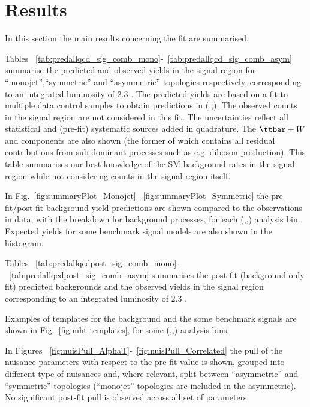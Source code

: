 \section{Results}
\label{sec:results}

In this section the main results concerning the fit are summarised. 

Tables ~\ref{tab:predallqcd_sig_comb_mono}-~\ref{tab:predallqcd_sig_comb_asym} summarise 
the predicted and observed yields in the signal region 
for ``monojet'',``symmetric'' and ``asymmetric'' topologies respectively, 
corresponding to an integrated luminosity of 2.3 \ifb.
The predicted yields are based on a fit to multiple data control samples to obtain predictions in (\nj,\nb,\scalht). 
The observed counts in the signal region are not considered in this fit. 
The uncertainties reflect all statistical and (pre-fit) systematic sources added in quadrature. 
The $\ttbar+W$ and \znunu components are also shown (the former of which contains all residual contributions from sub-dominant processes such as e.g. diboson production). 
This table summarises our best knowledge of the SM background rates in the signal region while not considering counts in the signal region itself. 

In Fig.~\ref{fig:summaryPlot_Monojet}-~\ref{fig:summaryPlot_Symmetric} the pre-fit/post-fit background yield predictions 
are shown compared to the observations in data, with the breakdown for background processes, for each (\njet,\nb,\scalht) analysis bin. 
Expected yields for some benchmark signal models are also shown in the histogram. 

Tables ~\ref{tab:predallqcdpost_sig_comb_mono}-~\ref{tab:predallqcdpost_sig_comb_asym} summarises the post-fit (background-only fit) predicted backgrounds and the 
observed yields in the signal region corresponding to an integrated luminosity of 2.3 \ifb. 

Examples of \mht templates for the background and the some benchmark signals are shown in Fig.~\ref{fig:mht-templates}, 
for some (\njet,\nb,\scalht) analysis bins. 

In Figures ~\ref{fig:nuisPull_AlphaT}-~\ref{fig:nuisPull_Correlated} the pull 
of the nuisance parameters with respect to the pre-fit value is shown, 
grouped into different type of nuisances and, where relevant, 
split between ``asymmetric'' and ``symmetric'' topologies 
(``monojet'' topologies are included in the asymmetric). \\
No significant post-fit pull is observed across all set of parameters. 

